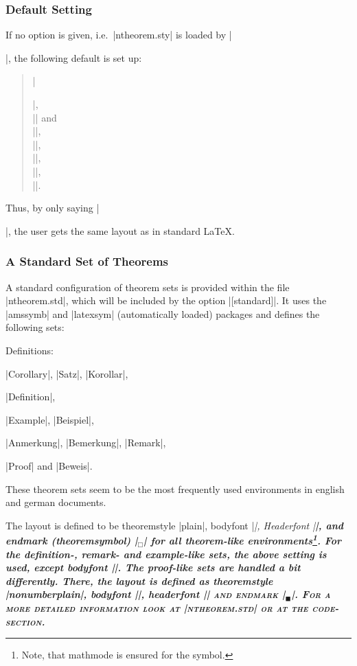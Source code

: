 \documentclass{ltxdoc}
\theoremstyle{marginbreak}
\theoremstyle{changebreak}
\theoremstyle{change}
\theoremstyle{plain}
\theoremstyle{nonumberplain}
\begin{document}
\subsubsection{Default Setting}

If no option is given, i.e.\ |ntheorem.sty| is loaded by
|\usepackage{ntheorem.sty}|, the following default is set up:
\begin{quote} 
|\theoremstyle{plain}|,\\
|\theoremheaderfont{\normalfont\bfseries}| and\\
|\theorembodyfont{\itshape}|,\\
|\theoremseparator{}|,\\
||,\\
||, \\
|\theoremsymbol{}|.
\end{quote}
Thus, by only saying |\newtheorem{...}{...}|, the user gets
the same layout as in standard \LaTeX.


\subsubsection{A Standard Set of Theorems}\label{sec:standard}

A standard configuration of theorem sets is provided within
the file |ntheorem.std|, which will be included by the option
|[standard]|. It uses the |amssymb| and |latexsym| (automatically
loaded) packages and defines the following sets:
\begin{nlist}{Definitions:}
 \item[Theorems:] %
  |Corollary|, |Satz|, |Korollar|,
 \item[Definitions:] |Definition|,
 \item[Examples:] |Example|, |Beispiel|,
 \item[Remarks:] |Anmerkung|, |Bemerkung|, |Remark|,
 \item[Proofs:] |Proof| and |Beweis|.
\end{nlist}
These theorem sets seem to be the most frequently used environments 
in english and german
documents.

The layout is defined to be theoremstyle |plain|, bodyfont |\itshape|,
Headerfont |\bfseries|, and endmark (theoremsymbol)
|\ensuremath{_\Box}| for all theorem-like environments\footnote{Note, 
that mathmode is ensured for the symbol.}.
For the definition-, remark- and example-like sets,
the above setting is used, except bodyfont |\upshape|.
The proof-like sets are handled a bit differently. There, the layout 
is defined as theoremstyle |nonumberplain|, bodyfont |\upshape|,
headerfont |\scshape| and endmark |\ensuremath{_\blacksquare}|. 
For a more detailed information look at 
|ntheorem.std| or at the code-section.
\end{document}

